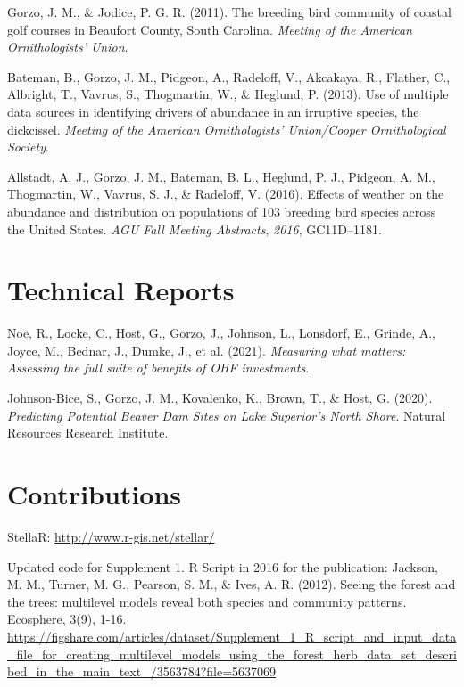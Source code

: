 \documentclass[11pt,a4paper,]{awesome-cv}
\newlength{\cslhangindent}
\newenvironment{CSLReferences}[2] %
 {\begin{list}{}{%
  \setlength{\itemindent}{0pt}
  \setlength{\leftmargin}{0pt}
  \setlength{\parsep}{0pt}
  \ifodd #1
   \setlength{\leftmargin}{\cslhangindent}
   \setlength{\itemindent}{-1\cslhangindent}
  \fi
  \setlength{\itemsep}{#2\baselineskip}}}
 {\end{list}}
\begin{document}
\begin{CSLReferences}{1}{0}
Gorzo, J. M., \& Jodice, P. G. R. (2011). The breeding bird community of
coastal golf courses in Beaufort County, South Carolina. \emph{Meeting
of the American Ornithologists' Union}.

Bateman, B., Gorzo, J. M., Pidgeon, A., Radeloff, V., Akcakaya, R.,
Flather, C., Albright, T., Vavrus, S., Thogmartin, W., \& Heglund, P.
(2013). Use of multiple data sources in identifying drivers of abundance
in an irruptive species, the dickcissel. \emph{Meeting of the American
Ornithologists' Union/Cooper Ornithological Society}.

Allstadt, A. J., Gorzo, J. M., Bateman, B. L., Heglund, P. J., Pidgeon,
A. M., Thogmartin, W., Vavrus, S. J., \& Radeloff, V. (2016). Effects of
weather on the abundance and distribution on populations of 103 breeding
bird species across the United States. \emph{AGU Fall Meeting
Abstracts}, \emph{2016}, GC11D--1181.

\end{CSLReferences}

\section{Technical Reports}\label{technical-reports}

\label{refs-972c61dc0a31e77772ca1bd1a185967e}
\begin{CSLReferences}{1}{0}
Noe, R., Locke, C., Host, G., Gorzo, J., Johnson, L., Lonsdorf, E.,
Grinde, A., Joyce, M., Bednar, J., Dumke, J., et al. (2021).
\emph{Measuring what matters: Assessing the full suite of benefits of
OHF investments}.

Johnson-Bice, S., Gorzo, J. M., Kovalenko, K., Brown, T., \& Host, G.
(2020). \emph{Predicting Potential Beaver Dam Sites on Lake Superior's
North Shore}. Natural Resources Research Institute.

\end{CSLReferences}

\section{Contributions}\label{contributions}

StellaR: \url{http://www.r-gis.net/stellar/}

Updated code for Supplement 1. R Script in 2016 for the publication:
Jackson, M. M., Turner, M. G., Pearson, S. M., \& Ives, A. R. (2012).
Seeing the forest and the trees: multilevel models reveal both species
and community patterns. Ecosphere, 3(9), 1-16.
\url{https://figshare.com/articles/dataset/Supplement_1_R_script_and_input_data_file_for_creating_multilevel_models_using_the_forest_herb_data_set_described_in_the_main_text_/3563784?file=5637069}
\end{document}
